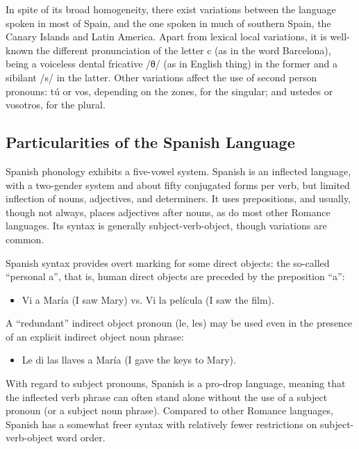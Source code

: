 \begin{multicols}{2}
In spite of its broad homogeneity, there exist variations between the language spoken in most of Spain, and the one spoken in much of southern Spain, the Canary Islands and Latin America. Apart from lexical local variations, it is well-known the different pronunciation of the letter c (as in the word Barcelona), being a voiceless dental fricative /θ/ (as in English thing) in the former and a sibilant /s/ in the latter. Other variations affect the use of second person pronouns: tú or vos, depending on the zones, for the singular; and ustedes or vosotros, for the plural.

\subsection{Particularities of the Spanish Language}

Spanish phonology exhibits a five-vowel system. Spanish is an inflected language, with a two-gender system and about fifty conjugated forms per verb, but limited inflection of nouns, adjectives, and determiners. It uses prepositions, and usually, though not always, places adjectives after nouns, as do most other Romance languages. Its syntax is generally subject-verb-object, though variations are common. \cite{spanishgram}


Spanish syntax provides overt marking for some direct objects: the so-called "`personal a"', that is, human direct objects are preceded by the preposition “a”:

\begin{itemize}    
  \item[] Vi a María (I saw Mary) vs. Vi la película (I saw the film).
\end{itemize}

A "`redundant"' indirect object pronoun (le, les) may be used even in the presence of an explicit indirect object noun phrase:

\begin{itemize}    
  \item[] Le di las llaves a María (I gave the keys to Mary).
\end{itemize}

With regard to subject pronouns, Spanish is a pro-drop language, meaning that the inflected verb phrase can often stand alone without the use of a subject pronoun (or a subject noun phrase). Compared to other Romance languages, Spanish has a somewhat freer syntax with relatively fewer restrictions on subject-verb-object word order.


\end{multicols}
